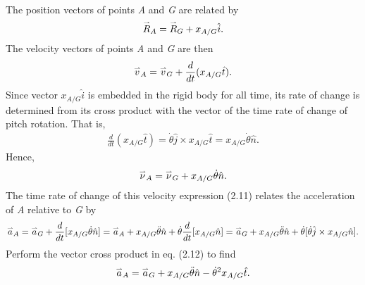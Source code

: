 \documentclass{AeroStructure-ERJohnson}
\def\harp#1{\smash{\mathord{\buildrel{\lower3pt\hbox{$\scriptscriptstyle\rightharpoonup$}}\over{#1}}}}
\begin{document}
{\def\thefigure{2.5}
}


The position vectors of points \textit{A} and \textit{G} are related by
\begin{align}\label{eq2.8}
\harp{R}_{A}=\harp{R}_{G}+x_{A/G} \hat{i}.
\end{align}
The velocity vectors of points \textit{A} and \textit{G} are then
\begin{align}\label{eq2.9}
\harp{v}_{A}=\harp{v}_{G}+\frac{d}{d t}(x_{A/G} \hat{t}).
\end{align}
Since vector $x_{A/G} \hat{i}$ is embedded in the rigid body for all time, its rate of change is determined from its cross product with the vector of the time rate of change of pitch rotation. That is,
\begin{align}\label{eq2.10}
\frac{d}{d t}(x_{A/G} \hat{t})=\dot{\theta} \hat{j} \times x_{A/G} \hat{t}=x_{A/G} \dot{\theta} \hat{n}.
\end{align}
Hence,
\begin{align}\label{eq2.11}
\harp{\nu}_{A}=\harp{\nu}_{G}+ x_{A/G} \dot{\theta} \hat{n}.
\end{align}
The time rate of change of this velocity expression (2.11) relates the acceleration of \textit{A} relative to \textit{G} by
\begin{align}\label{eq2.12}
\harp{a}_{A}=\harp{a}_{G}+\frac{d}{d t}[x_{A/G} \dot{\theta} \hat{n}]=\harp{a}_{A}+x_{A/G} \ddot{\theta} \hat{n}+\dot{\theta} \frac{d}{d t}[x_{A/G} \hat{n}]=\harp{a}_{G}+x_{A/G} \ddot{\theta} \hat{n}+\dot{\theta}[\dot{\theta} \hat{j} \times x_{A/G} \hat{n}].
\end{align}
Perform the vector cross product in eq. (2.12) to find
\begin{align}\label{eq2.13}
\harp{a}_{A}=\harp{a}_{G}+x_{A/G} \ddot{\theta} \hat{n}-\dot{\theta}^{2} x_{A/G} \hat{t}.
\end{align}
\end{document}
